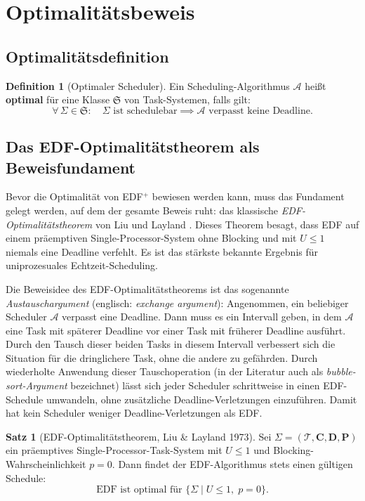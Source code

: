 ﻿\documentclass[a4paper,12pt]{article}
\theoremstyle{definition}
\newtheorem{definition}{Definition}
\newtheorem{satz}{Satz}
\begin{document}
	\section{Optimalitätsbeweis}

	\subsection{Optimalitätsdefinition}

	\begin{definition}[Optimaler Scheduler]
		Ein Scheduling-Algorithmus $\mathcal{A}$ hei\ss{}t \textbf{optimal} für eine
		Klasse $\mathfrak{S}$ von Task-Systemen, falls gilt:
		\[
		\forall\, \Sigma \in \mathfrak{S}: \quad
		\Sigma \text{ ist schedulebar} \implies \mathcal{A} \text{ verpasst keine Deadline}.
		\]
	\end{definition}

	\subsection{Das EDF-Optimalitätstheorem als Beweisfundament}
	\label{subsec:edf_fundament}

	Bevor die Optimalität von EDF$^+$ bewiesen werden kann, muss das
	Fundament gelegt werden, auf dem der gesamte Beweis ruht: das klassische
	\emph{EDF-Optimalitätstheorem} von Liu und Layland \cite{Liu1973}.
	Dieses Theorem besagt, dass EDF auf einem präemptiven Single-Processor-System
	ohne Blo\-cking und mit $U \le 1$ niemals eine Deadline verfehlt. Es ist das
	stärkste bekannte Ergebnis für uniprozesuales Echtzeit-Scheduling.

	Die Beweisidee des EDF-Optimalitätstheorems ist das sogenannte
	\emph{Austauschargument} (englisch: \emph{exchange argument}): Angenommen,
	ein beliebiger Scheduler $\mathcal{A}$ verpasst eine Deadline. Dann muss es
	ein Intervall geben, in dem $\mathcal{A}$ eine Task mit späterer Deadline
	vor einer Task mit früherer Deadline ausführt. Durch den Tausch dieser
	beiden Tasks in diesem Intervall verbessert sich die Situation für die
	dringlichere Task, ohne die andere zu gefährden. Durch wiederholte Anwendung
	dieser Tauschoperation (in der Literatur auch als \emph{bubble-sort-Argument}
	bezeichnet) lässt sich jeder Scheduler schrittweise in einen EDF-Schedule
	umwandeln, ohne zusätzliche Deadline-Verletzungen einzuführen. Damit hat
	kein Scheduler weniger Deadline-Verletzungen als EDF.

	\begin{satz}[EDF-Optimalitätstheorem, Liu \& Layland 1973]
		\label{satz:edf_optimal}
		Sei $\Sigma = (\mathcal{T}, \mathbf{C}, \mathbf{D}, \mathbf{P})$ ein
		präemptives Single-Processor-Task-System mit $U \le 1$ und Blocking-Wahrscheinlichkeit
		$p = 0$. Dann findet der EDF-Algorithmus stets einen gültigen Schedule:
		\[
		\text{EDF ist optimal für } \bigl\{\Sigma \mid U \le 1,\; p = 0\bigr\}.
		\]
	\end{satz}
\end{document}
